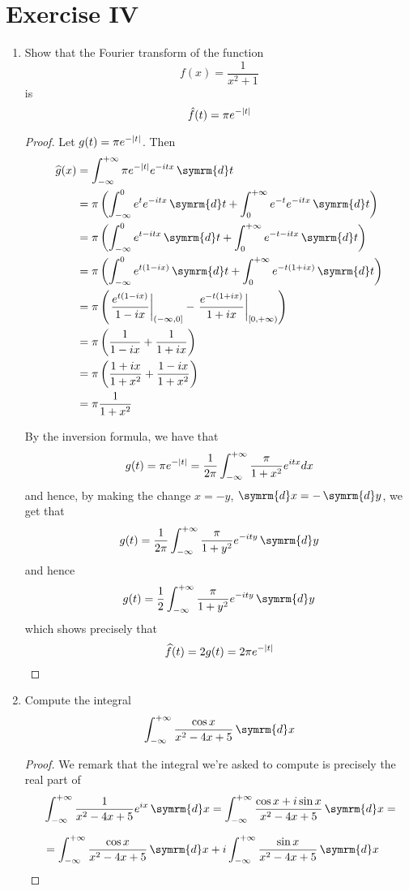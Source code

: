 \documentclass[a4paper, 12pt]{article}
\DeclarePairedDelimiter\abs{\lvert}{\rvert}%
\newcommand*\diff{\mathop{}\!\symrm{d}}
\begin{document}
\section*{Exercise IV}

\begin{enumerate}
    \item Show that the Fourier transform of the function
    \[
        f(x) = \frac{1}{x^2 + 1}
    \]
    is
    \[
        \hat{f}(t) = \pi e^{-\abs{t}}
    \]
    
    \begin{proof}
    Let \(g(t) = \pi e^{- \abs{t}}\). Then
    \begin{align*}
        \widehat{g}(x) &= \int_{-\infty}^{+\infty} \pi e^{-\abs{t}} e^{-i t x} \diff t \\
        &= \pi \left(\int_{-\infty}^{0} e^{t} e^{-i t x} \diff t + \int_{0}^{+\infty} e^{-t} e^{-i t x} \diff t\right) \\
        &= \pi \left(\int_{-\infty}^{0} e^{t - i t x} \diff t + \int_{0}^{+\infty} e^{-t - i t x} \diff t\right) \\
        &= \pi \left(\int_{-\infty}^{0} e^{t (1 - i x)} \diff t + \int_{0}^{+\infty} e^{-t (1 + i x)} \diff t\right) \\
        &= \pi \left(\left.\frac{e^{t(1 - i x)}}{1 - i x}\right|_{(-\infty, 0]} - \left.\frac{e^{-t(1 + i x)}}{1 + i x}\right|_{[0, +\infty)}\right) \\
        &= \pi \left(\frac{1}{1 - i x} + \frac{1}{1 + i x} \right) \\
        &= \pi \left(\frac{1 + i x}{1 + x^2} + \frac{1 - i x}{1 + x^2}\right) \\
        &= \pi \frac{1}{1 + x^2}
    \end{align*}
    
    By the inversion formula, we have that
    \[
        g(t) = \pi e^{-\abs{t}} = \frac{1}{2 \pi} \int_{-\infty}^{+\infty} \frac{\pi}{1 + x^2} e^{itx} dx
    \]
    and hence, by making the change \(x = -y\), \(\diff x = - \diff y\), we get that
    \[
        g(t) = \frac{1}{2\pi} \int_{-\infty}^{+\infty} \frac{\pi}{1 + y^2} e^{-ity} \diff y
    \]
    and hence
    \[
        g(t) = \frac{1}{2} \int_{-\infty}^{+\infty} \frac{\pi}{1 + y^2} e^{-ity} \diff y
    \]
    which shows precisely that
    \[
        \widehat{f}(t) = 2 g(t) = 2\pi e^{-\abs{t}}
    \]
    \end{proof}
    
    \item Compute the integral
    \[
        \int_{-\infty}^{+\infty} \frac{\cos x}{x^2 - 4x + 5} \diff x
    \]
    \begin{proof}
    We remark that the integral we're asked to compute is precisely the real part of
    \begin{align*}
        &\int_{-\infty}^{+\infty} \frac{1}{x^2 - 4x + 5} e^{ix} \diff x =
        \int_{-\infty}^{+\infty} \frac{\cos x + i \sin x}{x^2 - 4x + 5} \diff x = \\[1.5ex]
        &= \int_{-\infty}^{+\infty} \frac{\cos x}{x^2 - 4x + 5} \diff x + i \int_{-\infty}^{+\infty} \frac{\sin x}{x^2 - 4x + 5} \diff x
    \end{align*}
    \end{proof}
    

\end{enumerate}
\end{document}
